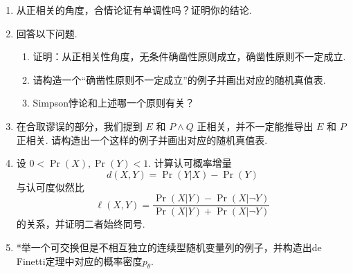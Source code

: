 \begin{enumerate}[wide, labelindent=0pt]
    \item \label{exercise:monotone-positive-related} 从正相关的角度，合情论证有单调性吗？证明你的结论.
    
    \item 回答以下问题. 
    \begin{enumerate}
        \item 证明：从正相关性角度，无条件确凿性原则成立，确凿性原则不一定成立.
        \item 请构造一个“确凿性原则不一定成立”的例子并画出对应的随机真值表.
        \item Simpson悖论和上述哪一个原则有关？
    \end{enumerate}

    \item 在合取谬误的部分，我们提到 $E$ 和 $P \wedge Q$ 正相关，并不一定能推导出 $E$ 和 $P$ 正相关. 请构造出一个这样的例子并画出对应的随机真值表.

    \item \label{exercise:admissible} 设 $0< \Pr(X),\Pr(Y) < 1$. 计算认可概率增量
    \begin{equation}
        d(X, Y) = \Pr(Y|X) - \Pr(Y)
    \end{equation}
    与认可度似然比
    \begin{equation}
        \ell(X, Y) = \frac{\Pr(X|Y) - \Pr(X|\lnot Y)}{\Pr(X|Y) + \Pr(X|\lnot Y)}
    \end{equation}
    的关系，并证明二者始终同号.

    \item *举一个可交换但是不相互独立的连续型随机变量列的例子，并构造出de Finetti定理中对应的概率密度$p_\theta$.
\end{enumerate}